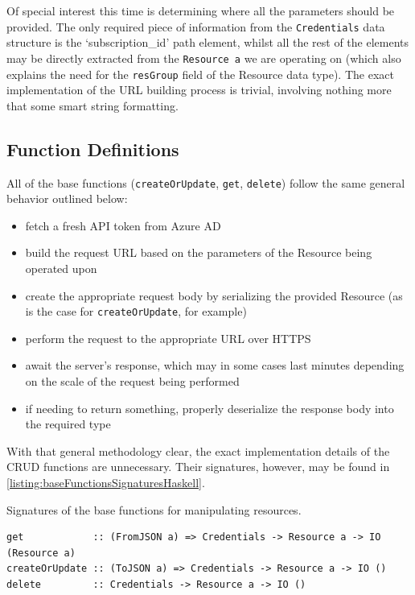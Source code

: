 \documentclass[11pt]{report}
\begin{document}
Of special interest this time is determining where all the parameters should be
provided. The only required piece of information from the \texttt{Credentials}
data structure is the `subscription\_id' path element, whilst all
the rest of the elements may be directly extracted from the \texttt{Resource a}
we are operating on (which also explains the need for the \texttt{resGroup}
field of the Resource data type). \newline
The exact implementation of the URL building process is trivial, involving
nothing more that some smart string formatting.

\subsection{Function Definitions}

All of the base functions (\texttt{createOrUpdate}, \texttt{get},
\texttt{delete}) follow the same general behavior outlined below:

\begin{itemize}
    \item{} fetch a fresh API token from Azure AD
    \item{} build the request URL based on the parameters of the Resource being
        operated upon
    \item{} create the appropriate request body by serializing the provided
        Resource (as is the case for \texttt{createOrUpdate}, for example)
    \item{} perform the request to the appropriate URL over HTTPS
    \item{} await the server's response, which may in some cases last minutes
        depending on the scale of the request being performed
    \item{} if needing to return something, properly deserialize the response
        body into the required type
\end{itemize}

With that general methodology clear, the exact implementation details of the
CRUD functions are unnecessary. Their signatures, however, may be found in
\autoref{listing:baseFunctionsSignaturesHaskell}.

\begin{listing}[H]
\label{listing:baseFunctionsSignaturesHaskell}
\caption{Signatures of the base functions for manipulating resources.}
\begin{verbatim}
get            :: (FromJSON a) => Credentials -> Resource a -> IO (Resource a)
createOrUpdate :: (ToJSON a) => Credentials -> Resource a -> IO ()
delete         :: Credentials -> Resource a -> IO ()
\end{verbatim}
\end{listing}
\end{document}
